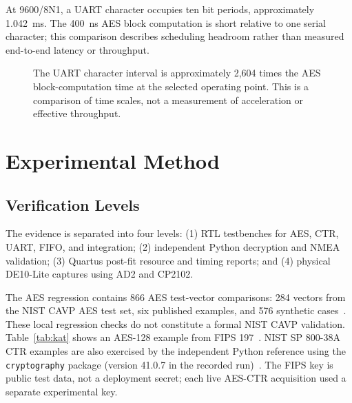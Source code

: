 \documentclass[runningheads]{llncs}
\begin{document}
At 9600/8N1, a UART character occupies ten bit periods, approximately 1.042~ms. The 400~ns AES block computation is short relative to one serial character; this comparison describes scheduling headroom rather than measured end-to-end latency or throughput.

\begin{figure}[H]
\centering
{}
\caption{The UART character interval is approximately 2,604 times the AES block-computation time at the selected operating point. This is a comparison of time scales, not a measurement of acceleration or effective throughput.}
\label{fig:prefetch}
\end{figure}

\section{Experimental Method}
\subsection{Verification Levels}
The evidence is separated into four levels: (1) RTL testbenches for AES, CTR, UART, FIFO, and integration; (2) independent Python decryption and NMEA validation; (3) Quartus post-fit resource and timing reports; and (4) physical DE10-Lite captures using AD2 and CP2102.

The AES regression contains 866 AES test-vector comparisons: 284 vectors from the NIST CAVP AES test set, six published examples, and 576 synthetic cases~\cite{CAVP}. These local regression checks do not constitute a formal NIST CAVP validation. Table~\ref{tab:kat} shows an AES-128 example from FIPS 197~\cite{FIPS197}. NIST SP 800-38A CTR examples are also exercised by the independent Python reference using the \texttt{cryptography} package (version 41.0.7 in the recorded run)~\cite{SP80038A}. The FIPS key is public test data, not a deployment secret; each live AES-CTR acquisition used a separate experimental key.
\end{document}
